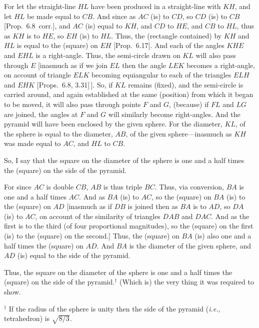 \begin{Parallel}{}{}
{For let the straight-line $HL$ have been produced in a straight-line with $KH$, and let
$HL$ be made equal to $CB$. And since as $AC$ (is) to $CD$, 
so $CD$ (is) to $CB$ [Prop.~6.8~corr.], and $AC$ (is) equal to $KH$, and $CD$ to
$HE$, and $CB$ to $HL$, thus as $KH$ is to $HE$, so $EH$ (is) to $HL$.
Thus,  the (rectangle contained) by $KH$ and $HL$ is equal to the
(square) on $EH$ [Prop.~6.17]. And each of the angles $KHE$ and
$EHL$ is a right-angle. Thus, the semi-circle drawn on $KL$ 
will also pass through $E$ [inasmuch as if we join $EL$ then the angle
$LEK$ becomes a right-angle, on account of triangle $ELK$
becoming equiangular to each of the triangles $ELH$ and $EHK$ [Props.~6.8, 3.31]\,]. So, if
$KL$ remains (fixed), and the semi-circle is carried around, and again
established at the same (position) from which it began to be moved, 
it will also pass through points $F$ and $G$, (because) if  $FL$ and
$LG$ are joined, the angles at $F$ and $G$ will similarly become  right-angles. And the pyramid will have been enclosed by the given sphere.
For the diameter, $KL$,  of the sphere is equal to the diameter, $AB$,
of the given sphere---inasmuch as $KH$ was made equal to $AC$, 
and $HL$ to $CB$. 

So, I say that the square on the diameter of the sphere is
one and a half times the (square) on the side of the pyramid.

For since $AC$ is double $CB$, $AB$ is thus triple $BC$. Thus,
via conversion, $BA$ is one and a half times $AC$. And as
$BA$ (is) to $AC$, so the (square) on $BA$ (is) to the (square) on $AD$
[inasmuch as if $DB$ is joined then as $BA$ is to $AD$, so
$DA$ (is) to $AC$, on account of the similarity of triangles
$DAB$ and $DAC$. And as the first is to the third (of four
proportional magnitudes), so the (square) on the first (is) to the
(square) on the second.] Thus, the (square) on $BA$
(is) also one and a half times the (square) on $AD$. 
And $BA$ is the diameter of the given sphere, and $AD$
(is) equal to the side of the pyramid.

Thus, the square on the diameter of the sphere is one and a half
times the (square) on the side of the pyramid.$^\dag$ (Which is) the very thing
it was required to show.}
\end{Parallel}
{\footnotesize\noindent$^\dag$ If the radius of the sphere is unity then the side of the pyramid ({\em i.e.}, tetrahedron) is $\sqrt{8/3}$.}

